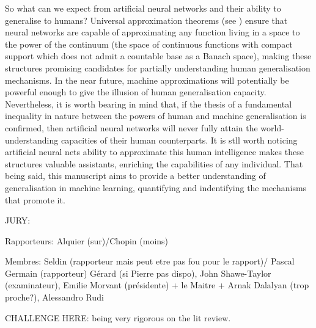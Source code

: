 So what can we expect from artificial neural networks and their ability to generalise to humans? Universal approximation theorems (see \eg \citealp{lu2017expressive,park2021minimum}) ensure that neural networks are capable of approximating any function living in a space to the power of the continuum (\eg the space of continuous functions with compact support which does not admit a countable base as a Banach space), making these structures promising candidates for partially understanding human generalisation mechanisms.
In the near future, machine approximations will potentially be powerful enough to give the illusion of human generalisation capacity. Nevertheless, it is worth bearing in mind that, if the thesis of a fundamental inequality in nature between the powers of human and machine generalisation is confirmed, then artificial neural networks will never fully attain the world-understanding capacities of their human counterparts. It is stll worth noticing artificial neural nets ability to approximate this human intelligence makes these structures valuable assistants, enriching the capabilities of any individual. That being said, this manuscript aims to provide a better understanding of generalisation in machine learning, quantifying and indentifying the mechanisms that promote it.







JURY: 


Rapporteurs: Alquier (sur)/Chopin (moins)

Membres: Seldin (rapporteur mais peut etre pas fou pour le rapport)/ Pascal Germain (rapporteur) Gérard (si Pierre pas dispo), John Shawe-Taylor (examinateur), Emilie Morvant (présidente) + le Maitre + Arnak Dalalyan (trop proche?), Alessandro Rudi
 


CHALLENGE HERE: being very rigorous on the lit review.
\newpage